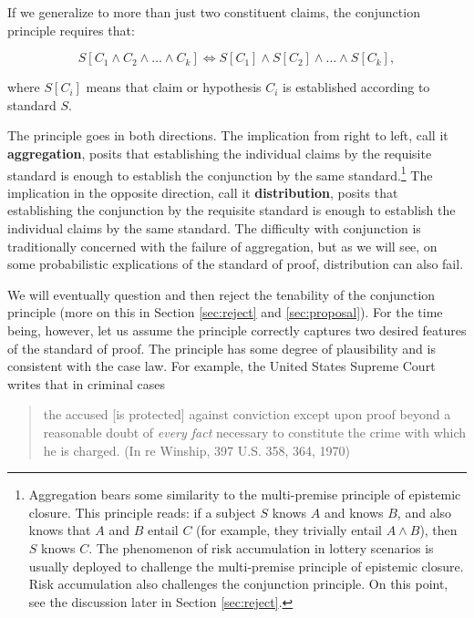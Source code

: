 \documentclass[
  10pt,
  dvipsnames,enabledeprecatedfontcommands]{scrartcl}
\begin{document}
\noindent If we generalize to more than just two constituent claims, the
conjunction principle requires that:

\[S[C_1 \wedge C_2  \wedge \dots \wedge  C_k] \Leftrightarrow S[C_1] \wedge S[C_2]  \wedge \dots \wedge  S[C_k],\]

\noindent where \(S[C_i]\) means that claim or hypothesis \(C_i\) is
established according to standard \(S\).

The principle goes in both directions. The implication from right to
left, call it \textbf{aggregation}, posits that establishing the
individual claims by the requisite standard is enough to establish the
conjunction by the same standard.\footnote{Aggregation bears some
  similarity to the multi-premise principle of epistemic closure. This
  principle reads: if a subject \(S\) knows \(A\) and knows \(B\), and
  also knows that \(A\) and \(B\) entail \(C\) (for example, they
  trivially entail \(A\wedge B\)), then \(S\) knows \(C\). The
  phenomenon of risk accumulation in lottery scenarios is usually
  deployed to challenge the multi-premise principle of epistemic
  closure. Risk accumulation also challenges the conjunction principle.
  On this point, see the discussion later in Section \ref{sec:reject}.}
The implication in the opposite direction, call it
\textbf{distribution}, posits that establishing the conjunction by the
requisite standard is enough to establish the individual claims by the
same standard. The difficulty with conjunction is traditionally
concerned with the failure of aggregation, but as we will see, on some
probabilistic explications of the standard of proof, distribution can
also fail.

We will eventually question and then reject the tenability of the
conjunction principle (more on this in Section \ref{sec:reject} and
\ref{sec:proposal}). For the time being, however, let us assume the
principle correctly captures two desired features of the standard of
proof. The principle has some degree of plausibility and is consistent
with the case law. For example, the United States Supreme Court writes
that in criminal cases

\begin{quote}
the accused [is protected] against conviction except upon proof beyond a reasonable doubt of \textit{every fact} necessary to constitute the crime with which he is charged. \linebreak 
(In re Winship, 397 U.S. 358, 364, 1970)
\end{quote}
\end{document}
